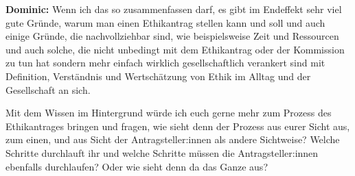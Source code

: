 \documentclass[a4paper,12pt,twoside]{scrreprt}
\begin{document}
\textbf{Dominic:} Wenn ich das so zusammenfassen darf, es gibt im Endeffekt sehr viel gute Gründe, warum man einen Ethikantrag stellen kann und soll und auch einige Gründe, die nachvollziehbar sind, wie beispielsweise Zeit und Ressourcen und auch solche, die nicht unbedingt mit dem Ethikantrag oder der Kommission zu tun hat sondern mehr einfach wirklich gesellschaftlich verankert sind mit Definition, Verständnis und Wertschätzung von Ethik im Alltag und der Gesellschaft an sich.

Mit dem Wissen im Hintergrund würde ich euch gerne mehr zum Prozess des Ethikantrages bringen und fragen, wie sieht denn der Prozess aus eurer Sicht aus, zum einen, und aus Sicht der Antragsteller:innen als andere Sichtweise? Welche Schritte durchlauft ihr und welche Schritte müssen die Antragsteller:innen ebenfalls durchlaufen? Oder wie sieht denn da das Ganze aus?
\end{document}

